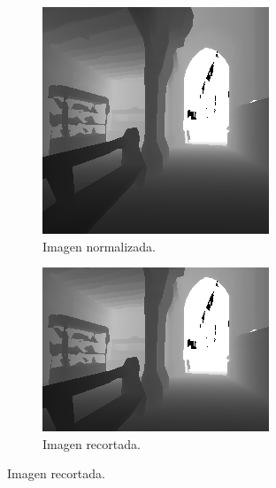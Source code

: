 \begin{figure}
    \centering
    \begin{subfigure}[b]{.475\textwidth}
    \centering
    \includegraphics[width=\textwidth]{imagenes/cap5/normalized.png}
    \caption{Imagen normalizada.}
    \end{subfigure}
    \begin{subfigure}[b]{.475\textwidth}
    \centering
    \includegraphics[width=\textwidth]{imagenes/cap5/trimmed.png}
    \caption{Imagen recortada.}
    \end{subfigure}
    

\end{figure}
